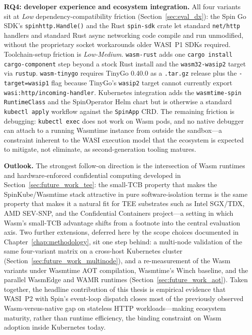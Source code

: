 \begin{sloppypar}
\textbf{RQ4: developer experience and ecosystem integration.} All four variants sit at \emph{Low} dependency-compatibility friction (Section~\ref{sec:eval_dx}): the Spin Go \acs{SDK}'s \texttt{spinhttp.Handle()} and the Rust \texttt{spin-sdk} crate let standard \texttt{net/http} handlers and standard Rust async networking code compile and run unmodified, without the proprietary socket workarounds older \acs{WASI}~P1 \acs{SDK}s required. Toolchain-setup friction is \emph{Low-Medium}. \texttt{wasm-rust} adds one \texttt{cargo install cargo-component} step beyond a stock Rust install and the \texttt{wasm32-wasip2} target via \texttt{rustup}. \texttt{wasm-tinygo} requires TinyGo 0.40.0 as a \texttt{.tar.gz} release plus the \texttt{-target=wasip1} flag because TinyGo's \texttt{wasip2} target cannot currently export \texttt{wasi:http/incoming-handler}. Kubernetes integration adds the \texttt{wasmtime-spin} \texttt{RuntimeClass} and the SpinOperator Helm chart but is otherwise a standard \texttt{kubectl apply} workflow against the \texttt{SpinApp} \acs{CRD}. The remaining friction is debugging: \texttt{kubectl exec} does not work on \acs{Wasm} pods, and no native debugger can attach to a running Wasmtime instance from outside the sandbox---a constraint inherent to the \acs{WASI} execution model that the ecosystem is expected to mitigate, not eliminate, as second-generation tooling matures.
\end{sloppypar}

\textbf{Outlook.} The strongest follow-on direction is the intersection of \acs{Wasm} runtimes and hardware-enforced confidential computing developed in Section~\ref{sec:future_work_tee}: the small-\acs{TCB} property that makes the SpinKube/Wasmtime stack attractive in pure software-isolation terms is the same property that makes it a natural fit for \acs{TEE} substrates such as Intel \acs{SGX}/\acs{TDX}, AMD \acs{SEV}-SNP, and the Confidential Containers project---a setting in which \acs{Wasm}'s small-\acs{TCB} advantage shifts from a footnote into the central evaluation axis. Two further extensions, deferred here by the scope choices documented in Chapter~\ref{chap:methodology}, sit one step behind: a multi-node validation of the same four-variant matrix on a cross-host Kubernetes cluster (Section~\ref{sec:future_work_multinode}), and a re-measurement of the \acs{Wasm} variants under Wasmtime \acs{AOT} compilation, Wasmtime's Winch baseline, and the parallel WasmEdge and \acs{WAMR} runtimes (Section~\ref{sec:future_work_aot}). Taken together, the headline contribution of this thesis is empirical evidence that \acs{WASI}~P2 with Spin's event-loop dispatch closes most of the previously observed \acs{Wasm}-versus-native gap on stateless \acs{HTTP} workloads---making ecosystem maturity, rather than runtime efficiency, the binding constraint on \acs{Wasm} adoption inside Kubernetes today.
